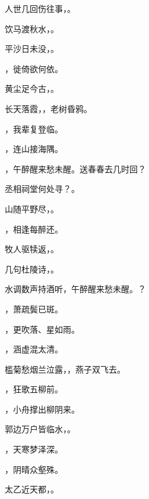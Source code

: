 \documentclass[12pt, a4paper, addpoints]{exam}
\begin{document}
\begin{questions}
\question[2] 人世几回伤往事，\uline{\qquad\qquad\qquad\qquad}。

\question[2] 饮马渡秋水，\uline{\qquad\qquad\qquad\qquad}。

\question[2] 平沙日未没，\uline{\qquad\qquad\qquad\qquad}。

\question[2] \uline{\qquad\qquad\qquad\qquad}，徙倚欲何依。

\question[2] 黄尘足今古，\uline{\qquad\qquad\qquad\qquad}。

\question[2] 长天落霞，\uline{\qquad\qquad\qquad\qquad}，老树昏鸦。

\question[2] \uline{\qquad\qquad\qquad\qquad}，我辈复登临。

\question[2] \uline{\qquad\qquad\qquad\qquad}，连山接海隅。

\question[2] \uline{\qquad\qquad\qquad\qquad}，午醉醒来愁未醒。送春春去几时回？

\question[2] 丞相祠堂何处寻？\uline{\qquad\qquad\qquad\qquad}。

\question[2] 山随平野尽，\uline{\qquad\qquad\qquad\qquad}。

\question[2] \uline{\qquad\qquad\qquad\qquad}，相逢每醉还。

\question[2] 牧人驱犊返，\uline{\qquad\qquad\qquad\qquad}。

\question[2] 几句杜陵诗，\uline{\qquad\qquad\qquad\qquad}。

\question[2] 水调数声持酒听，午醉醒来愁未醒。\uline{\qquad\qquad\qquad\qquad}？

\question[1] \uline{\qquad\qquad\qquad\qquad}，萧疏鬓已斑。

\question[2] \uline{\qquad\qquad\qquad\qquad}，更吹落、星如雨。

\question[2] \uline{\qquad\qquad\qquad\qquad}，涵虚混太清。

\question[2] 槛菊愁烟兰泣露，\uline{\qquad\qquad\qquad\qquad}，燕子双飞去。

\question[2] \uline{\qquad\qquad\qquad\qquad}，狂歌五柳前。

\question[2] \uline{\qquad\qquad\qquad\qquad}，小舟撑出柳阴来。

\question[2] 郭边万户皆临水，\uline{\qquad\qquad\qquad\qquad}。

\question[2] \uline{\qquad\qquad\qquad\qquad}，天寒梦泽深。

\question[2] \uline{\qquad\qquad\qquad\qquad}，阴晴众壑殊。

\question[2] 太乙近天都，\uline{\qquad\qquad\qquad\qquad}。


\end{questions}
\end{document}
